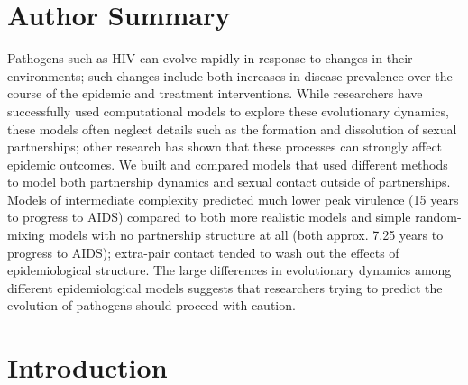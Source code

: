 \documentclass[10pt,letterpaper]{article}
\begin{document}
\section*{Author Summary}


Pathogens such as HIV can evolve rapidly in response to changes
in their environments; such changes include both increases in disease
prevalence over the course of the epidemic and treatment
interventions. While researchers have successfully used computational
models to explore these evolutionary dynamics, these models often
neglect details such as the formation and
dissolution of sexual partnerships; other research has shown that
these processes can strongly affect epidemic outcomes. We built and
compared models that used different methods to
model both partnership dynamics and sexual
contact outside of partnerships. Models of intermediate
complexity predicted much lower peak virulence (15 years to
progress to AIDS) compared to both more realistic models
and simple random-mixing models with no partnership structure
at all (both approx. 7.25 years to progress to AIDS); 
extra-pair contact tended to wash out the effects
of epidemiological structure. The large differences
in evolutionary dynamics among different epidemiological models
suggests that researchers trying to predict the evolution of
pathogens should proceed with caution.

\linenumbers

\section*{Introduction}
\end{document}
